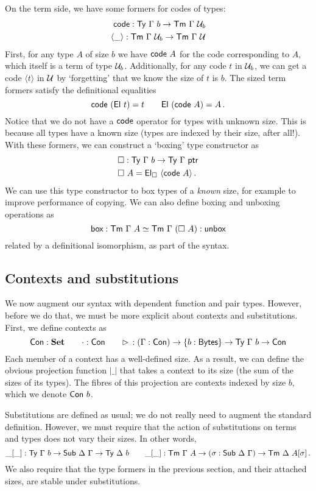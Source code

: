 On the term side, we have some formers for codes of types: \[
\begin{aligned}
\textsf{code} : \textsf{Ty}\ \Gamma\ b \to \textsf{Tm}\ \Gamma\ \mathcal{U}_b \\
\langle\_\rangle : \textsf{Tm}\ \Gamma\ \mathcal{U}_b \to \textsf{Tm}\ \Gamma\ \mathcal{U}
\end{aligned}
\] First, for any type \(A\) of size \(b\) we have \(\textsf{code}\ A\) for the
code corresponding to \(A\), which itself is a term of type \(\mathcal{U}_b\).
Additionally, for any code \(t\) in \(\mathcal{U}_b\), we can get a code
\(\langle t \rangle\) in \(\mathcal{U}\) by `forgetting' that we know the size
of \(t\) is \(b\). The sized term formers satisfy the definitional
equalities \[
\textsf{code}\ (\textsf{El}\ t) = t \qquad \textsf{El}\ (\textsf{code}\ A) = A \,.
\] Notice that we do not have a \(\textsf{code}\) operator for types with
unknown size. This is because all types have a known size (types are
indexed by their size, after all!). With these formers, we can construct
a `boxing' type constructor as \[
\begin{aligned}
&\square : \textsf{Ty}\ \Gamma\ b \to \textsf{Ty}\ \Gamma\ \textsf{ptr} \\
&\square\ A = \textsf{El}_\square\ \langle \textsf{code}\ A\rangle \,.
\end{aligned}
\] We can use this type constructor to box types of a \emph{known} size,
for example to improve performance of copying. We can also define boxing
and unboxing operations as \[
\syn{box} : \Tm\ \Gamma\ A \simeq \Tm\ \Gamma\ (\square\ A) : \syn{unbox} \\
\] related by a definitional isomorphism, as part of the syntax.

\subsection{Contexts and
substitutions}\label{contexts-and-substitutions}

We now augment our syntax with dependent function and pair types.
However, before we do that, we must be more explicit about contexts and
substitutions. First, we define contexts as \[
\textsf{Con} : \textbf{Set} \qquad \cdot : \textsf{Con} \qquad
\rhd\, : (\Gamma : \textsf{Con}) \to \{b : \textsf{Bytes}\} \to \textsf{Ty}\ \Gamma\ b \to \textsf{Con}
\] Each member of a context has a well-defined size. As a result, we can
define the obvious projection function \(|\_|\) that takes a context to
its size (the sum of the sizes of its types). The fibres of this
projection are contexts indexed by size \(b\), which we denote
\(\textsf{Con}\ b\).

Substitutions are defined as usual; we do not really need to augment the
standard definition. However, we must require that the action of
substitutions on terms and types does not vary their sizes. In other
words, \[
\_[\_] : \Ty\ \Gamma\ b \to \Sub\ \Delta\ \Gamma \to \Ty\ \Delta\ b \qquad
\_[\_] : \Tm\ \Gamma\ A \to (\sigma : \Sub\ \Delta\ \Gamma) \to \Tm\ \Delta\ A[\sigma] \,.
\] We also require that the type formers in the previous section, and
their attached sizes, are stable under substitutions.


